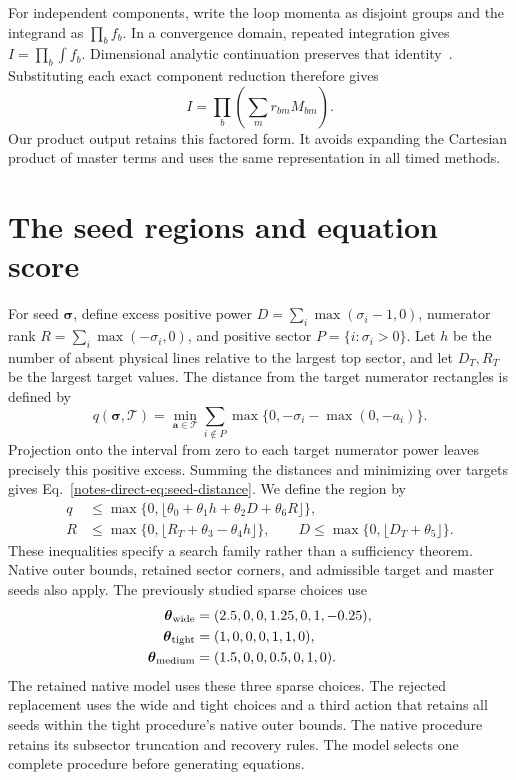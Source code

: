 \documentclass[11pt,a4paper]{article}
\begin{document}
For independent components, write the loop momenta as disjoint groups and the integrand as $\prod_b f_b$. In a convergence domain, repeated integration gives $I=\prod_b\int f_b$. Dimensional analytic continuation preserves that identity~\cite{Weinzierl2022}. Substituting each exact component reduction therefore gives
\begin{equation}
 I=\prod_b\left(\sum_m r_{bm}M_{bm}\right).
 \label{notes-direct-eq:product-reduction}
\end{equation}
Our product output retains this factored form. It avoids expanding the Cartesian product of master terms and uses the same representation in all timed methods.

\section{The seed regions and equation score}
\label{notes-direct-app:sparse}
For seed $\boldsymbol\sigma$, define excess positive power $D=\sum_i\max(\sigma_i-1,0)$, numerator rank $R=\sum_i\max(-\sigma_i,0)$, and positive sector $P=\{i:\sigma_i>0\}$. Let $h$ be the number of absent physical lines relative to the largest top sector, and let $D_T,R_T$ be the largest target values. The distance from the target numerator rectangles is defined by
\begin{equation}
 q(\boldsymbol\sigma,\mathcal T)=\min_{\boldsymbol a\in\mathcal T}
 \sum_{i\notin P}\max\{0,-\sigma_i-\max(0,-a_i)\}.
 \label{notes-direct-eq:seed-distance}
\end{equation}
Projection onto the interval from zero to each target numerator power leaves precisely this positive excess. Summing the distances and minimizing over targets gives Eq.~\eqref{notes-direct-eq:seed-distance}. We define the region by
\begin{align}
 q&\leq\max\{0,\lfloor\theta_0+\theta_1h+\theta_2D+\theta_6R\rfloor\},\nonumber\\
 R&\leq\max\{0,\lfloor R_T+\theta_3-\theta_4h\rfloor\},\qquad
 D\leq\max\{0,\lfloor D_T+\theta_5\rfloor\}.
 \label{notes-direct-eq:seed-regions}
\end{align}
These inequalities specify a search family rather than a sufficiency theorem. Native outer bounds, retained sector corners, and admissible target and master seeds also apply. The previously studied sparse choices use
\begin{align}
 \boldsymbol\theta_{\rm wide}&=(2.5,0,0,1.25,0,1,-0.25),\nonumber\\
 \boldsymbol\theta_{\rm tight}&=(1,0,0,0,1,1,0),\nonumber\\
 \boldsymbol\theta_{\rm medium}&=(1.5,0,0,0.5,0,1,0).
 \label{notes-direct-eq:seed-values}
\end{align}
The retained native model uses these three sparse choices. The rejected replacement uses the wide and tight choices and a third action that retains all seeds within the tight procedure's native outer bounds. The native procedure retains its subsector truncation and recovery rules. The model selects one complete procedure before generating equations.
\end{document}
